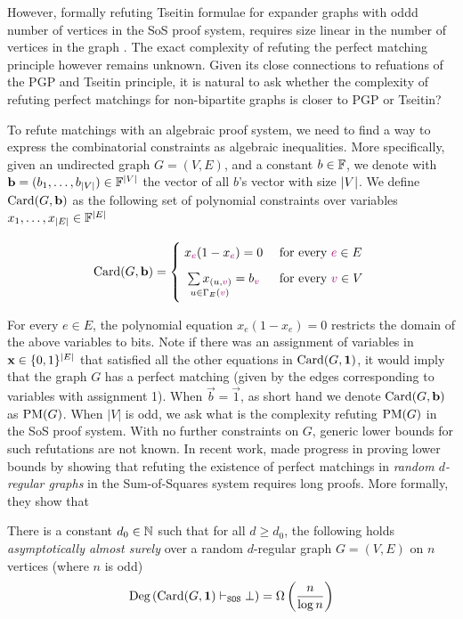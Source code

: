 \documentclass[11pt]{article}
\begin{document}
However, formally refuting Tseitin formulae for expander graphs with oddd number of vertices in the SoS proof system, requires size linear in the number of vertices in the graph \cite{grigoriev2001linear}.
The exact complexity of refuting the perfect matching principle however remains unknown.
Given its close connections to refuations of the PGP and Tseitin principle, it is natural to ask whether the complexity of refuting perfect matchings for non-bipartite graphs is closer to PGP or Tseitin?
\par
To refute matchings with an algebraic proof system, we need to find a way to express the combinatorial constraints as algebraic inequalities.
More specifically, given an undirected graph $G=(V,E)$, and a constant $b\in \mathbb{F}$, we denote with $\mathbf{b} = (b_1, \dots, b_{|V|})  \in \mathbb{F}^{|V|}$ the vector of all $b$'s vector with size $|V|$.
We define $\text{Card}(G, \mathbf{b})$ as the following set of polynomial constraints over variables $x_1, \dots, x_{|E|} \in \mathbb{F}^{|E|}$

\[
        \Card{G, \vec{b}}=
        \Bigger[10]\{\begin{array}{@{}cl}
                x_{\highlight{e}}(1 - x_{\highlight{e}}) = 0 & \text{ for every $\highlight{e} \in E$}\\[3mm]
                \underset{u \in \Neighbourhood{E}{\highlight{v}}}{\sum x_{(u,\highlight{v})}}= b_{\highlight{v}} & \text{ for every $\highlight{v} \in V$} \\[3mm]
        \end{array}
\]

For every $e \in E$, the polynomial equation $x_e(1 - x_e) = 0$ restricts the domain of the above variables to bits.
Note if there was an assignment of variables in $\mathbf{x} \in \{0,1\}^{|E|}$ that satisfied all the other equations in $\text{Card}(G, \mathbf{1})$, it would imply that the graph $G$ has a perfect matching (given by the edges corresponding to variables with assignment 1).
When $\vec{b} = \vec{1}$, as short hand we denote $\text{Card}(G, \mathbf{b})$ as $\text{PM}(G)$.
When $|V|$ is odd, we ask what is the complexity refuting $\text{PM}(G)$ in the SoS proof system.
With no further constraints on $G$, generic lower bounds for such refutations are not known.
In recent work, \citet{Austrin_2022} made progress in proving lower bounds by showing that refuting the existence of perfect matchings in \emph{random $d$-regular graphs} in the Sum-of-Squares system requires long proofs.
More formally, they show that

\begin{theorem}\label{thm:prev-thm}
There is a constant $d_0 \in \mathbb{N}$ such that for all $d \geq d_0$, the following holds \emph{asymptotically almost surely} over a random $d$-regular graph $G=(V,E)$ on $n$ vertices (where $n$ is odd) \[ \text{Deg}\left(\text{Card}(G, \mathbf{1}) \vdash_{\texttt{SOS}} \bot\right) = \Omega\left(\frac{n}{\log n}\right)\]
\end{theorem}
\end{document}
